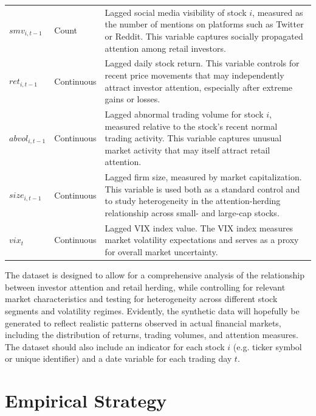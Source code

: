\documentclass[12pt]{article}
\begin{document}
\begin{table}[htbp]
\begin{threeparttable}
\begin{tabularx}{\textwidth}{@{}l l X@{}}
$smv_{i,t-1}$ & Count & Lagged social media visibility of stock $i$, measured as the number of mentions on platforms such as Twitter or Reddit. This variable captures socially propagated attention among retail investors. \\

$ret_{i,t-1}$ & Continuous & Lagged daily stock return. This variable controls for recent price movements that may independently attract investor attention, especially after extreme gains or losses. \\

$abvol_{i,t-1}$ & Continuous & Lagged abnormal trading volume for stock $i$, measured relative to the stock's recent normal trading activity. This variable captures unusual market activity that may itself attract retail attention. \\

$size_{i,t-1}$ & Continuous & Lagged firm size, measured by market capitalization. This variable is used both as a standard control and to study heterogeneity in the attention-herding relationship across small- and large-cap stocks. \\

$vix_t$ & Continuous & Lagged VIX index value. The VIX index measures market volatility expectations and serves as a proxy for overall market uncertainty. \\
\bottomrule
\end{tabularx}
\end{threeparttable}
\end{table}

The dataset is designed to allow for a comprehensive analysis of the relationship between investor attention and retail herding,
while controlling for relevant market characteristics and testing for heterogeneity across different stock segments and volatility regimes.
Evidently, the synthetic data will hopefully be generated to reflect realistic patterns observed in actual financial markets, including the
distribution of returns, trading volumes, and attention measures. The dataset should also include an indicator for each stock $i$ (e.g. ticker symbol
or unique identifier) and a date variable for each trading day $t$.

\section{Empirical Strategy}
\end{document}
